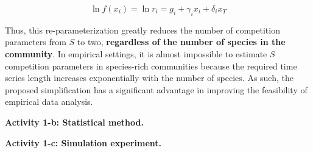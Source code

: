 \documentclass[12pt, class=article, crop=false]{standalone}
\begin{document}
\begin{equation}
    \ln f(x_i) = \ln r_i = g_i + \gamma_i x_i + \delta_i x_T
\end{equation}

Thus, this re-parameterization greatly reduces the number of competition parameters from $S$ to two, \textbf{regardless of the number of species in the community}. In empirical settings, it is almost impossible to estimate $S$ competition parameters in species-rich communities because the required time series length increases exponentially with the number of species. As such, the proposed simplification has a significant advantage in improving the feasibility of empirical data analysis.

\textbf{Activity 1-b: Statistical method.}

\textbf{Activity 1-c: Simulation experiment.}


\end{document}
